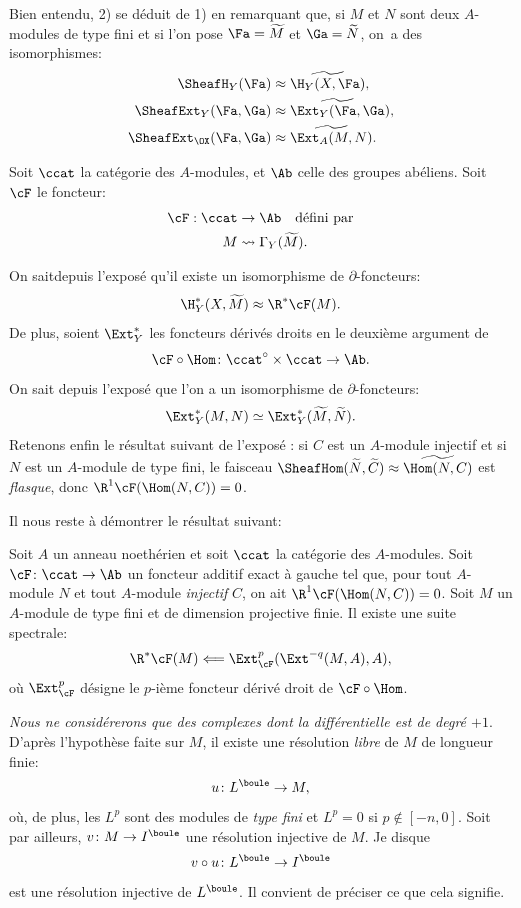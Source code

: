 Bien entendu, 2) se d\'eduit de 1) en remarquant que, si $M$ et $N$ sont deux $A$-modules de type fini et si l'on pose ${{\Fa}}=\widetilde{M}$ et ${{\Ga}}=\widetilde{N}$, on~a des isomorphismes:
\begin{align*}
\SheafH_Y({\Fa}) &\approx \widetilde{\H_Y(X, {\Fa})}, \\
\SheafExt_Y({\Fa}, {\Ga}) &\approx \widetilde{\Ext_Y({\Fa}, {\Ga}}), \\
\SheafExt_{\OX}({\Fa}, {\Ga}) &\approx \widetilde{\Ext_A(M, N)}.
\end{align*}

Soit $\ccat$ la cat\'egorie des $A$-modules, et $\Ab$ celle des groupes ab\'eliens. Soit ${\cF}$ le foncteur:
\begin{align*}
\cF: \ccat&\to \Ab \quad\text{d\'efini par} \\
 M &\rightsquigarrow \Gamma_Y(\widetilde{M}).
\end{align*}

On sait\pageoriginale depuis l'expos\'e  qu'il existe un isomorphisme de $\partial$-foncteurs:
\[
\H^\ast_Y(X, \widetilde{M})\approx \R^\ast {\cF}(M).
\]
De plus, soient $\Ext^\ast_Y$ les foncteurs d\'eriv\'es droits en le deuxi\`eme argument de
\[{\cF}\circ \Hom\colon \ccat^\circ \times \ccat \to \Ab.
\]
On sait depuis l'expos\'e  que l'on a un isomorphisme de $\partial$-foncteurs:
\[
\Ext^\ast_Y(M, N)\simeq \Ext^\ast_Y(\widetilde{M}, \widetilde{N}).
\]
Retenons enfin le r\'esultat suivant de l'expos\'e : si $C$ est un $A$-module injectif et si $N$ est un $A$-module de type fini, le faisceau $\SheafHom(\widetilde{N}, \widetilde{C})\approx\widetilde{\Hom(N, C)}$ est \emph{flasque}, donc $\R^1{\cF}(\Hom(N, C))=0$.

Il nous reste \`a d\'emontrer le r\'esultat suivant:

\begin{lemme} \label{VIII.1.2} Soit $A$ un anneau noeth\'erien et soit $\ccat$ la cat\'egorie des $A$-modules. Soit ${\cF}\colon \ccat\to\Ab$ un foncteur additif exact \`a gauche tel que, pour tout $A$-module $N$ \ignorespaces et tout $A$-module \emph{injectif} $C$, on ait $\R^1{\cF}(\Hom(N, C))=0$. Soit $M$ un $A$-module de type fini et de dimension projective finie. Il existe une suite spectrale:
\[
\R^\ast {\cF}(M)\Longleftarrow \Ext^p_{{\cF}}(\Ext^{-q}(M, A), A), \]
o\`u $\Ext^p_{{\cF}}$ d\'esigne le $p$-i\`eme foncteur d\'eriv\'e droit de ${\cF}\circ \Hom$.
\end{lemme}

\emph{Nous ne consid\'ererons que des complexes dont la diff\'erentielle est de degr\'e $+1$}. D'apr\`es l'hypoth\`ese faite sur $M$, il existe une r\'esolution \emph{libre} de $M$ de longueur finie:
\[u\colon L^\boule \to M, \]
o\`u, de plus, les $L^p$ sont des modules de \emph{type fini} et $L^p=0$ si $p\not\in[-n, 0]$. Soit par ailleurs, $v\colon M\to I^\boule$ une r\'esolution injective de $M$. Je dis\pageoriginale que
\begin{equation} \label{eq:VIII.1.1} v\circ u\colon L^\boule\to I^\boule
\end{equation}
est une r\'esolution injective de $L^\boule$. Il convient de pr\'eciser ce que cela signifie.

